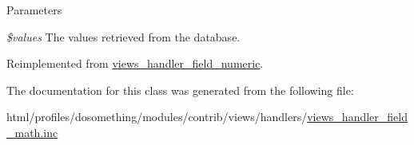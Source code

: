 \begin{DoxyParams}{Parameters}
\item[{\em \$values}]The values retrieved from the database. \end{DoxyParams}


Reimplemented from \hyperlink{classviews__handler__field__numeric_a9c76aeef951c45385fd91a22e5e656aa}{views\_\-handler\_\-field\_\-numeric}.

The documentation for this class was generated from the following file:\begin{DoxyCompactItemize}
\item 
html/profiles/dosomething/modules/contrib/views/handlers/\hyperlink{views__handler__field__math_8inc}{views\_\-handler\_\-field\_\-math.inc}\end{DoxyCompactItemize}
